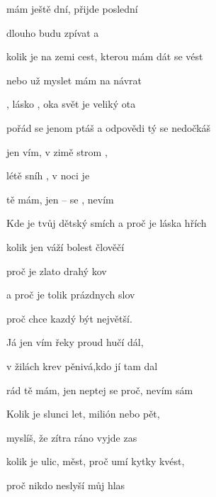 


       

\zs
{} mám ještě {dní},  přijde poslední

dlouho budu zpívat a 

kolik je na zemi cest, kterou mám dát se vést

nebo už myslet mám na návrat
\ks

\zr
{}, lásko , oka
 svět je veliký ota

pořád se jenom ptáš a odpovědi tý se nedočkáš
\kr

\zr
{} jen vím, v zimě strom ,

 létě sníh , v noci je 

 tě mám,
jen --  se , nevím 
\kr

       

\zs
Kde je tvůj dětský smích a proč je láska hřích

kolik jen váží bolest člověčí

proč je zlato drahý kov

a proč je tolik prázdnych slov

proč chce kazdý být největší.
\ks

\zr  \kr

\zr
Já jen vím řeky proud hučí dál,

v žilách krev pěnivá,kdo jí tam dal

rád tě mám, jen neptej se proč, nevím sám
\kr

\zs
Kolik je slunci let, milión nebo pět,

myslíš, že zítra ráno vyjde zas

kolik je ulic, měst, proč umí kytky kvést,

proč nikdo neslyší můj hlas
\ks

\kp





